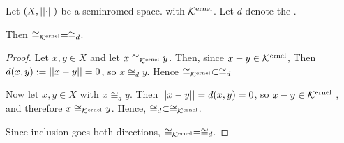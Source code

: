 \label{prop:equivalencemodkernelispseudometricequivalence}
\begin{prop}
    Let $(X,\left|\left| \cdot \right|\right|)$ be a seminromed space.
    with \SeminormKernel $\bf\mathcal{K}\rm^{ernel}$.
    Let $d$ denote the \SeminormInducedPseudometric.
    
    Then $\cong_{\bf\mathcal{K}\rm^{ernel}}=\cong_{d}$. 
    \begin{proof}
        Let $x,y \in X$ and let $x \cong_{\bf\mathcal{K}\rm^{ernel}}y$.
        Then, since $x-y \in \bf\mathcal{K}\rm^{ernel}$, 
        Then $d(x,y) := \left|\left| x-y \right|\right| =0$, so $x \cong_d y$. 
        Hence $\cong_{\bf\mathcal{K}\rm^{ernel}} \subset \cong_{d}$ 


        Now let $x,y \in X$ with $x \cong_d y$. 
        Then $\left|\left| x-y \right|\right|=d(x,y) = 0$, so $x-y \in \bf\mathcal{K}\rm^{ernel}$
        , and therefore $x \cong_{\bf\mathcal{K}\rm^{ernel}} y$. 
        Hence, $\cong_{d} \subset \cong_{\bf\mathcal{K}\rm^{ernel}}$. 

        Since inclusion goes both directions, $\cong_{\bf\mathcal{K}\rm^{ernel}} = \cong_d$.

    \end{proof} 
\end{prop}

